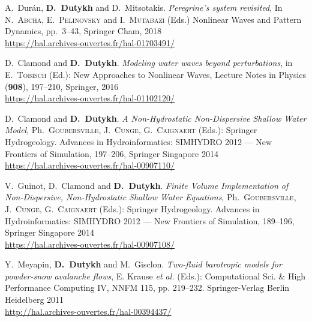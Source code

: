 \documentclass[final, a4paper, oneside, 12pt]{article}
\numberwithin{equation}{section}
\begin{document}
\begin{etaremune}


  \item A.~Dur\'an, \textbf{D.~Dutykh} and D.~Mitsotakis. \textit{Peregrine's system revisited}, In N.~\textsc{Abcha}, E.~\textsc{Pelinovsky} and I.~\textsc{Mutabazi} (Eds.) Nonlinear Waves and Pattern Dynamics, pp.~3--43, Springer Cham, 2018 \\ %
  \url{https://hal.archives-ouvertes.fr/hal-01703491/}
  


  \item D.~Clamond and \textbf{D.~Dutykh}. \textit{Modeling water waves beyond perturbations}, in E.~\textsc{Tobisch} (Ed.): New Approaches to Nonlinear Waves, Lecture Notes in Physics (\textbf{908}), 197--210, Springer, 2016 \\ %
  \url{https://hal.archives-ouvertes.fr/hal-01102120/}
  


  \item D.~Clamond and \textbf{D.~Dutykh}. \textit{A Non-Hydrostatic Non-Dispersive Shallow Water Model}, Ph.~\textsc{Goubersville}, J.~\textsc{Cunge}, G.~\textsc{Caignaert} (Eds.): Springer Hydrogeology. Advances in Hydroinformatics: SIMHYDRO 2012 --- New Frontiers of Simulation, 197--206, Springer Singapore 2014 \\ %
  \url{https://hal.archives-ouvertes.fr/hal-00907110/}

  \item V.~Guinot, D.~Clamond and \textbf{D.~Dutykh}. \textit{Finite Volume Implementation of Non-Dispersive, Non-Hydrostatic Shallow Water Equations}, Ph.~\textsc{Goubersville}, J.~\textsc{Cunge}, G.~\textsc{Caignaert} (Eds.): Springer Hydrogeology. Advances in Hydroinformatics: SIMHYDRO 2012 --- New Frontiers of Simulation, 189--196, Springer Singapore 2014 \\ %
  \url{https://hal.archives-ouvertes.fr/hal-00907108/}
  


  \item Y.~Meyapin, \textbf{D.~Dutykh} and M.~Gisclon. \textit{Two-fluid barotropic models for powder-snow avalanche flows}, E. Krause \emph{et al.} (Eds.): Computational Sci. \& High Performance Computing IV, NNFM 115, pp. 219--232. Springer-Verlag Berlin Heidelberg 2011 \\ %
  \url{http://hal.archives-ouvertes.fr/hal-00394437/}
  

\end{etaremune}
\end{document}
